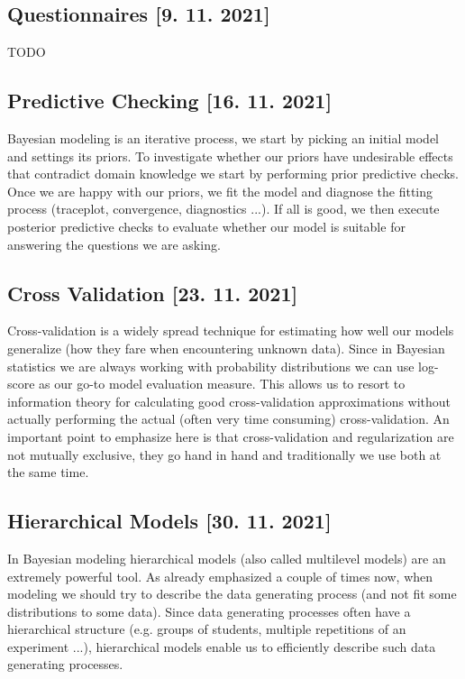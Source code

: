 \documentclass[fleqn,moreauthors,10pt]{ds_report}
\begin{document}
\subsection*{Questionnaires [9. 11. 2021]}

TODO

\subsection*{Predictive Checking [16. 11. 2021]}

Bayesian modeling is an iterative process, we start by picking an initial model and settings its priors. To investigate whether our priors have undesirable effects that contradict domain knowledge we start by performing prior predictive checks. Once we are happy with our priors, we fit the model and diagnose the fitting process (traceplot, convergence, diagnostics ...). If all is good, we then execute posterior predictive checks to evaluate whether our model is suitable for answering the questions we are asking.

\subsection*{Cross Validation [23. 11. 2021]}

Cross-validation is a widely spread technique for estimating how well our models generalize (how they fare when encountering unknown data). Since in Bayesian statistics we are always working with probability distributions we can use log-score as our go-to model evaluation measure. This allows us to resort to information theory for calculating good cross-validation approximations without actually performing the actual (often very time consuming) cross-validation. An important point to emphasize here is that cross-validation and regularization are not mutually exclusive, they go hand in hand and traditionally we use both at the same time.

\subsection*{Hierarchical Models [30. 11. 2021]}

In Bayesian modeling hierarchical models (also called multilevel models) are an extremely powerful tool. As already emphasized a couple of times now, when modeling we should try to describe the data generating process (and not fit some distributions to some data). Since data generating processes often have a hierarchical structure (e.g. groups of students, multiple repetitions of an experiment ...), hierarchical models enable us to efficiently describe such data generating processes.
\end{document}
